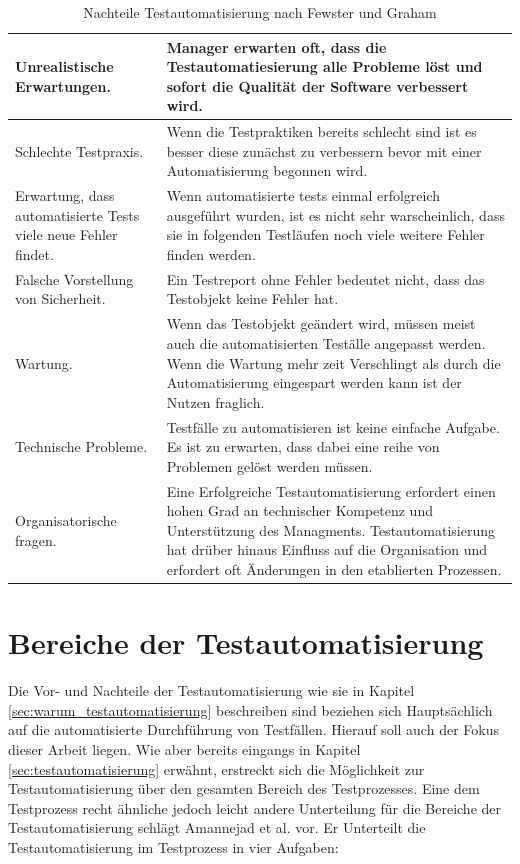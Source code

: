 \begin{table}
\begin{tabular}{p{}|p{}}
Unrealistische Erwartungen.
& Manager erwarten oft, dass die Testautomatiesierung alle Probleme löst und sofort die Qualität der Software verbessert wird. \\
\hline 
Schlechte Testpraxis.
& Wenn die Testpraktiken bereits schlecht sind ist es besser diese zunächst zu verbessern bevor mit einer Automatisierung begonnen wird. \\ 
\hline 
Erwartung, dass automatisierte Tests viele neue Fehler findet. & 
Wenn automatisierte tests einmal erfolgreich ausgeführt wurden, ist es nicht sehr warscheinlich, dass sie in folgenden Testläufen noch viele weitere Fehler finden werden.\\ 
\hline 
Falsche Vorstellung von Sicherheit. & Ein Testreport ohne Fehler bedeutet nicht, dass das Testobjekt keine Fehler hat.  \\ 
\hline 
Wartung. & Wenn das Testobjekt geändert wird, müssen meist auch die automatisierten Teställe angepasst werden. Wenn die Wartung mehr zeit Verschlingt als durch die Automatisierung eingespart werden kann ist der Nutzen fraglich.  \\ 
\hline 
Technische Probleme. & Testfälle zu automatisieren ist keine einfache Aufgabe. Es ist zu erwarten, dass dabei eine reihe von Problemen gelöst werden müssen. \\ 
\hline 
Organisatorische fragen. & Eine Erfolgreiche Testautomatisierung erfordert einen hohen Grad an technischer Kompetenz und Unterstützung des Managments. Testautomatisierung hat drüber hinaus Einfluss auf die Organisation und erfordert oft Änderungen in den etablierten Prozessen. \\ 
\end{tabular} 
\caption{Nachteile Testautomatisierung nach Fewster und Graham \cite{fewster_software_1999}}
\label{tbl:nachteile_testautomatisierung}
\end{table}





\section{Bereiche der Testautomatisierung}
\label{sec:bereiche_der_estautomatisierung}

Die Vor- und Nachteile der Testautomatisierung wie sie in Kapitel \ref{sec:warum_testautomatisierung} beschreiben sind beziehen sich Hauptsächlich auf die automatisierte Durchführung von Testfällen. Hierauf soll auch der Fokus dieser Arbeit liegen. Wie aber bereits eingangs in Kapitel \ref{sec:testautomatisierung} erwähnt, erstreckt sich die Möglichkeit zur Testautomatisierung über den gesamten Bereich des Testprozesses.
Eine dem Testprozess recht ähnliche jedoch leicht andere Unterteilung für die Bereiche der Testautomatisierung schlägt Amannejad et al. \cite{amannejad_search-based_2014} vor.
Er Unterteilt die Testautomatisierung im Testprozess in vier Aufgaben:


